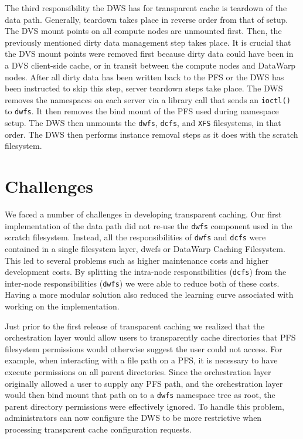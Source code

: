 \documentclass[10pt, conference, compsocconf]{IEEEtran}
\begin{document}
The third responsibility the DWS has for transparent cache is teardown of the data path.  Generally, teardown takes place in reverse order from that of setup.  The DVS mount points on all compute nodes are unmounted first.  Then, the previously mentioned dirty data management step takes place.  It is crucial that the DVS mount points were removed first because dirty data could have been in a DVS client-side cache, or in transit between the compute nodes and DataWarp nodes.  After all dirty data has been written back to the PFS or the DWS has been instructed to skip this step, server teardown steps take place.  The DWS removes the namespaces on each server via a library call that sends an \texttt{ioctl()} to \texttt{dwfs}.  It then removes the bind mount of the PFS used during namespace setup.  The DWS then unmounts the \texttt{dwfs}, \texttt{dcfs}, and \texttt{XFS} filesystems, in that order.  The DWS then performs instance removal steps as it does with the scratch filesystem.

\section{Challenges\label{sec_chal}}

We faced a number of challenges in developing transparent caching.  Our first implementation of the data path did not re-use the \texttt{dwfs} component used in the scratch filesystem.  Instead, all the responsibilities of \texttt{dwfs} and \texttt{dcfs} were contained in a single filesystem layer, dwcfs or DataWarp Caching Filesystem.  This led to several problems such as higher maintenance costs and higher development costs.  By splitting the intra-node responsibilities (\texttt{dcfs}) from the inter-node responsibilities (\texttt{dwfs}) we were able to reduce both of these costs.  Having a more modular solution also reduced the learning curve associated with working on the implementation.

Just prior to the first release of transparent caching we realized that the orchestration layer would allow users to transparently cache directories that PFS filesystem permissions would otherwise suggest the user could not access.  For example, when interacting with a file path on a PFS, it is necessary to have execute permissions on all parent directories.  Since the orchestration layer originally allowed a user to supply any PFS path, and the orchestration layer would then bind mount that path on to a \texttt{dwfs} namespace tree as root, the parent directory permissions were effectively ignored.  To handle this problem, administrators can now configure the DWS to be more restrictive when processing transparent cache configuration requests.
\end{document}

